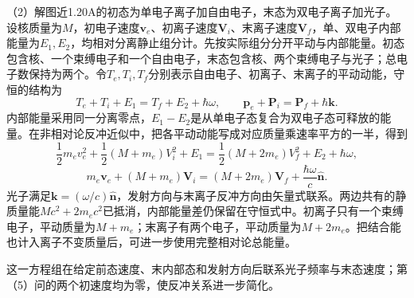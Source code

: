 \documentclass[UTF8,fontset=fandol,a4paper,11pt]{ctexart}
\begin{document}
（2）解图近1.20A的初态为单电子离子加自由电子，末态为双电子离子加光子。设核质量为$M$，初电子速度$\boldsymbol v_e$、初离子速度$\boldsymbol V_i$、末离子速度$\boldsymbol V_f$，单、双电子内部能量为$E_1,E_2$，均相对分离静止组分计。先按实际组分分开平动与内部能量。初态包含核、一个束缚电子和一个自由电子，末态包含核、两个束缚电子与光子；总电子数保持为两个。令$T_e,T_i,T_f$分别表示自由电子、初离子、末离子的平动动能，守恒的结构为
\[
T_e+T_i+E_1=T_f+E_2+\hbar\omega,\qquad
\boldsymbol p_e+\boldsymbol P_i=\boldsymbol P_f+\hbar\boldsymbol k.
\]
内部能量采用同一分离零点，$E_1-E_2$是从单电子态复合为双电子态可释放的能量。在非相对论反冲近似中，把各平动动能写成对应质量乘速率平方的一半，得到
\[
\boxed{\frac12m_ev_e^2+\frac12(M+m_e)V_i^2+E_1
=\frac12(M+2m_e)V_f^2+E_2+\hbar\omega},
\]
\[
\boxed{m_e\boldsymbol v_e+(M+m_e)\boldsymbol V_i
=(M+2m_e)\boldsymbol V_f+\frac{\hbar\omega}{c}\hat{\boldsymbol n}}.
\]
光子满足$\boldsymbol k=(\omega/c)\hat{\boldsymbol n}$，发射方向与末离子反冲方向由矢量式联系。两边共有的静质量能$Mc^2+2m_ec^2$已抵消，内部能量差仍保留在守恒式中。初离子只有一个束缚电子，平动质量为$M+m_e$；末离子有两个电子，平动质量为$M+2m_e$。把结合能也计入离子不变质量后，可进一步使用完整相对论总能量。

这一方程组在给定前态速度、末内部态和发射方向后联系光子频率与末态速度；第（5）问的两个初速度均为零，使反冲关系进一步简化。
\end{document}
